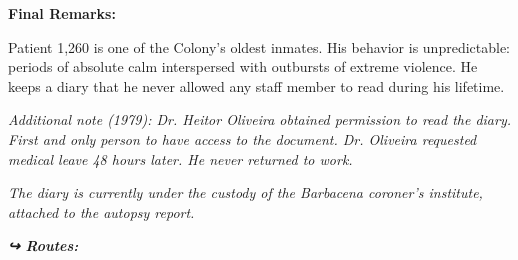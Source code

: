 \noindent \textbf{Final Remarks:}

\noindent Patient 1,260 is one of the Colony's oldest inmates. His behavior is unpredictable: periods of absolute calm interspersed with outbursts of extreme violence. He keeps a diary that he never allowed any staff member to read during his lifetime.

\noindent \textit{Additional note (1979): Dr. Heitor Oliveira obtained permission to read the diary. First and only person to have access to the document. Dr. Oliveira requested medical leave 48 hours later. He never returned to work.}

\noindent \textit{The diary is currently under the custody of the Barbacena coroner's institute, attached to the autopsy report.}

\vspace{0.5em}
\noindent\textit{\textbf{↪ Routes:}  \rotasep {} \rotasep {}}
